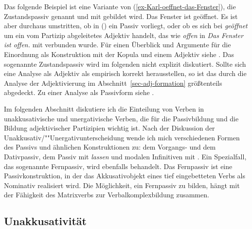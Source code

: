 \noindent
Das folgende Beispiel ist eine Variante von (\ref{ex-Karl-oeffnet-das-Fenster}), die Zustandspassiv genannt und mit \sein{} gebildet wird.
\ea 
Das Fenster ist geöffnet.
\z
Es ist aber durchaus umstritten, ob in () ein Passiv vorliegt,
oder ob es sich bei \emph{geöffnet} um ein vom Partizip abgeleitetes Adjektiv handelt, das wie
\emph{offen} in \emph{Das Fenster ist offen.} mit \sein verbunden wurde. Für einen Überblick und Argumente für die
Einordnung als Konstruktion mit der Kopula \sein und einem Adjektiv siehe
. Das sogenannte Zustandspassiv wird im folgenden nicht explizit
diskutiert. Sollte sich eine Analyse als Adjektiv als empirisch korrekt herausstellen, so ist das
durch die Analyse der Adjektivierung im Abschnitt~\ref{sec-adj-formation} größtenteils abgedeckt. Zu einer
Analyse als Passivform siehe .


Im folgenden Abschnitt diskutiere ich die Einteilung von Verben in unakkusativische und unergativische Verben,
die für die Passivbildung und die Bildung adjektivischer Partizipien wichtig ist. 
Nach der Diskussion der Unakkusativ/""Unergativunterscheidung wende ich
mich verschiedenen Formen des Passivs und ähnlichen Konstruktionen zu: dem Vorgangs- und
dem Dativpassiv, dem Passiv mit \emph{lassen} und modalen Infinitiven mit
\sein. Ein Spezialfall, das sogenannte Fernpassiv, wird ebenfalls behandelt. Das Fernpassiv
ist eine Passivkonstruktion, in der das Akkusativobjekt eines tief eingebetteten Verbs als
Nominativ realisiert wird. Die Möglichkeit, ein Fernpassiv zu bilden, hängt mit der Fähigkeit
des Matrixverbs zur Verbalkomplexbildung zusammen.

\subsection{Unakkusativität}
\label{sec-unakkusativitaet}\label{sec-unaccusativity}
\label{sec-phen-hilfsverbselektion}

